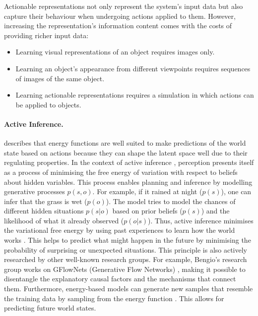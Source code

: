 Actionable representations not only represent the system's input data but also capture their behaviour when undergoing actions applied to them. However, increasing the representation's information content comes with the costs of providing richer input data:
\begin{itemize}
    \item Learning visual representations of an object requires images only.
    \item Learning an object's appearance from different viewpoints requires sequences of images of the same object.
    \item Learning actionable representations requires a simulation in which actions can be applied to objects. 
\end{itemize}

\paragraph{Active Inference.}  describes that energy functions are well suited to make predictions of the world state based on actions because they can shape the latent space well due to their regulating properties.
In the context of active inference , perception presents itself as a process of minimising the free energy \cite{hinton_training_2002} of variation with respect to beliefs about hidden variables. This process enables planning and inference by modelling generative processes $p(s,o)$. For example, if it rained at night ($p(s)$), one can infer that the grass is wet ($p(o)$). The model tries to model the chances of different hidden situations $p(s|o)$ based on prior beliefs ($p(s)$) and the likelihood of what it already observed ($p(o|s)$). 
Thus, active inference minimises the variational free energy by using past experiences to learn how the world works \cite{friston_active_2016}. This helps to predict what might happen in the future by minimising the probability of surprising or unexpected situations.
This principle is also actively researched by other well-known research groups. For example, Bengio's research group works on GFlowNets (Generative Flow Networks) , making it possible to disentangle the explanatory causal factors and the mechanisms that connect them.
Furthermore, energy-based models can generate new samples that resemble the training data by sampling from the energy function . This allows for predicting future world states.

